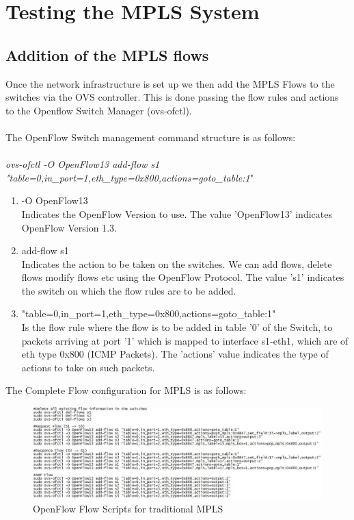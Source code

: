 \section{Testing the MPLS System}
\subsection{Addition of the MPLS flows}
Once the network infrastructure is set up we then add the MPLS Flows to the switches via the OVS controller. This is done passing the flow rules and actions to the Openflow Switch Manager (ovs-ofctl).\\
\\
The OpenFlow Switch management command structure is as follows: \\
\\
\textit{ovs-ofctl -O OpenFlow13 add-flow s1 "table=0,in\_port=1,eth\_type=0x800,actions=goto\_table:1}"
\\
\begin{enumerate}
\item -O OpenFlow13\\
Indicates the OpenFlow Version to use. The value 'OpenFlow13' indicates OpenFlow Version 1.3.
\item add-flow s1\\
Indicates the action to be taken on the switches. We can add flows, delete flows modify flows etc using the OpenFlow Protocol. The value 's1' indicates the switch on which the flow rules are to be added.
\item "table=0,in\_port=1,eth\_type=0x800,actions=goto\_table:1" \\
Is the flow rule where the flow is to be added in table '0' of the Switch, to packets arriving at port '1' which is mapped to interface s1-eth1, which are of eth type 0x800 (ICMP Packets). The 'actions' value indicates the type of actions to take on such packets.
\end{enumerate}

The Complete Flow configuration for MPLS is as follows:

\begin{figure}[H]
       \centering\includegraphics[width=\textwidth]{images/10_Open_Flow_flows_for_MPLS.JPG}
       \caption{OpenFlow Flow Scripts for traditional MPLS}
       \label{fig:compbest}
\end{figure}

